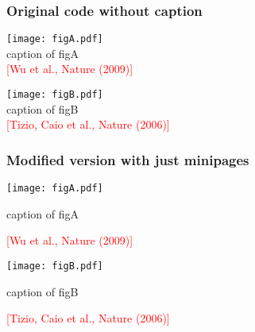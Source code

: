 \begin{frame}
    \frametitle{Original code without caption}
    \begin{minipage}{.5\textwidth}
    \hspace{-1.25cm}
    \centering
    \texttt{[image: figA.pdf]}\\
    \hspace{-1.25cm}
    caption of figA\\
    \scriptsize\textcolor{red}{[Wu et al., Nature (2009)]}
    \end{minipage}%
    \begin{minipage}{.5\textwidth}
    \hspace{+0.25cm}
    \centering
    \texttt{[image: figB.pdf]}\\
    \hspace{+0.25cm}
    caption of figB\\
    \scriptsize\textcolor{red}{[Tizio, Caio et al., Nature (2006)]}
    \end{minipage}
\end{frame}
    
    
    \begin{frame}
    \frametitle{Modified version with just minipages}
    \begin{minipage}{.5\textwidth}
    \centering
    \texttt{[image: figA.pdf]}
    
    caption of figA
    
    \scriptsize\textcolor{red}{[Wu et al., Nature (2009)]}
    \end{minipage}%
    \begin{minipage}{.5\textwidth}
    \centering
    \texttt{[image: figB.pdf]}
    
    caption of figB
    
    \scriptsize\textcolor{red}{[Tizio, Caio et al., Nature (2006)]}
    \end{minipage}
    \end{frame}
    
